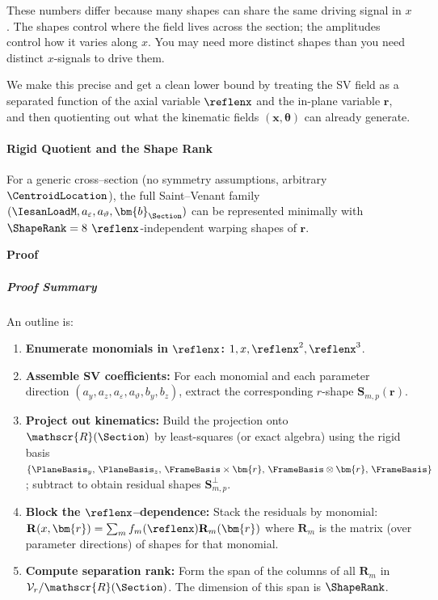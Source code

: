 These numbers differ because many shapes can share the same driving signal in \(x\). 
The shapes control where the field lives across the section; the amplitudes control how it varies along \(x\). 
You may need more distinct shapes than you need distinct \(x\)-signals to drive them.

We make this precise and get a clean lower bound by treating the SV field as a separated function of the axial variable \(\reflenx\) and the in-plane variable \(\bm{r}\), and then quotienting out what the kinematic fields \((\bm x,\bm\theta)\) can already generate.

\paragraph{Rigid Quotient and the Shape Rank}


\begin{proposition}\label{prop:min8}
For a generic cross–section (no symmetry assumptions, arbitrary \(\CentroidLocation\)), the full Saint–Venant family
\((\IesanLoadM,a_\varepsilon,a_\vartheta,\bm{b}_{\Section})\) can be represented minimally with \(\ShapeRank = 8\) \(\reflenx\)-independent warping shapes of \(\bm{r}\).
\end{proposition}

\textbf{Proof}

\subparagraph{Proof Summary}
An outline is:
\begin{enumerate}
    \item \textbf{Enumerate monomials in \(\reflenx\):} \( {1,x,\reflenx^2,\reflenx^3}\).
  \item \textbf{Assemble SV coefficients:} For each monomial and each parameter direction \((a_y,a_z,a_\varepsilon,a_\vartheta,b_y,b_z)\), extract the corresponding \(r\)-shape \( \mathbf{S}_{m,p}(\bm{r})\).
  \item \textbf{Project out kinematics:} Build the projection onto \(\mathscr{R}(\Section)\) by least-squares (or exact algebra) using the rigid basis \(\{\PlaneBasis_y,\,\PlaneBasis_z,\,\FrameBasis\times\bm{r},\,\FrameBasis\otimes\bm{r},\,\FrameBasis\}\); subtract to obtain residual shapes \( \mathbf{S}^{\perp}_{m,p}\).
  \item \textbf{Block the \(\reflenx\)–dependence:} Stack the residuals by monomial: \(\mathbf{R}(x,\bm{r})=\sum_m f_m(\reflenx)\mathbf{R}_m(\bm{r})\) where \(\mathbf{R}_m\) is the matrix (over parameter directions) of shapes for that monomial.
  \item \textbf{Compute separation rank:}
  Form the span of the columns of all \(\mathbf{R}_m\) in \( \mathcal{V}_r/\mathscr{R}(\Section)\). 
  The dimension of this span is \(\ShapeRank\). 
\end{enumerate}

